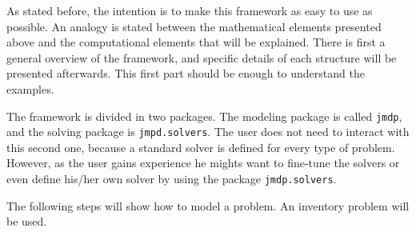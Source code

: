 \documentclass[11pt]{article}
\newcommand {\lil}{\lstinline}
\begin{document}
As stated before, the intention is to make this framework as easy to use as possible. An analogy is stated between the mathematical elements presented above and the computational elements that will be explained. There is first a general overview of the framework, and specific details of each structure will be presented afterwards. This first part should be enough to understand the examples.

The framework is divided in two packages. The modeling package is called \lstinline!jmdp!, and the solving package is \lstinline!jmpd.solvers!. The user does not need to interact with this second one, because a standard solver is defined for every type of problem. However, as the user gains experience he mights want to fine-tune the solvers or even define his/her own solver by using the package \lil!jmdp.solvers!.

The following steps will show how to model a problem. An inventory problem will be used.
\end{document}
